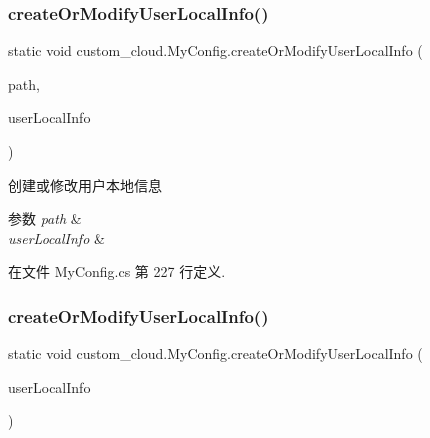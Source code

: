 \subsubsection{\texorpdfstring{create\+Or\+Modify\+User\+Local\+Info()}{createOrModifyUserLocalInfo()}\hspace{0.1cm}{\footnotesize\ttfamily [1/2]}}
{\footnotesize\ttfamily static void custom\+\_\+cloud.\+My\+Config.\+create\+Or\+Modify\+User\+Local\+Info (\begin{DoxyParamCaption}\item[{string}]{path,  }\item[{\hyperlink{classcustom__cloud_1_1_user_local_info}{User\+Local\+Info}}]{user\+Local\+Info }\end{DoxyParamCaption})\hspace{0.3cm}{\ttfamily [static]}}



创建或修改用户本地信息 


\begin{DoxyParams}{参数}
{\em path} & \\
\hline
{\em user\+Local\+Info} & \\
\hline
\end{DoxyParams}


在文件 My\+Config.\+cs 第 227 行定义.

\mbox{\label{classcustom__cloud_1_1_my_config_a979670e0bcb068c945cf047d68054b18}} 
\subsubsection{\texorpdfstring{create\+Or\+Modify\+User\+Local\+Info()}{createOrModifyUserLocalInfo()}\hspace{0.1cm}{\footnotesize\ttfamily [2/2]}}
{\footnotesize\ttfamily static void custom\+\_\+cloud.\+My\+Config.\+create\+Or\+Modify\+User\+Local\+Info (\begin{DoxyParamCaption}\item[{\hyperlink{classcustom__cloud_1_1_user_local_info}{User\+Local\+Info}}]{user\+Local\+Info }\end{DoxyParamCaption})\hspace{0.3cm}{\ttfamily [static]}}




